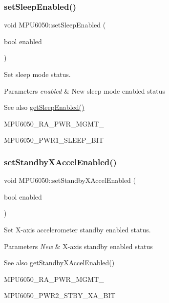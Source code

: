 \subsubsection{\texorpdfstring{setSleepEnabled()}{setSleepEnabled()}}
{\footnotesize\ttfamily void M\+P\+U6050\+::set\+Sleep\+Enabled (\begin{DoxyParamCaption}\item[{bool}]{enabled }\end{DoxyParamCaption})}

Set sleep mode status. 
\begin{DoxyParams}{Parameters}
{\em enabled} & New sleep mode enabled status \\
\hline
\end{DoxyParams}
\begin{DoxySeeAlso}{See also}
\mbox{\hyperlink{class_m_p_u6050_a196404ef04b959083d4bf5e6f1cd8b98}{get\+Sleep\+Enabled()}} 

M\+P\+U6050\+\_\+\+R\+A\+\_\+\+P\+W\+R\+\_\+\+M\+G\+M\+T\+\_ 

M\+P\+U6050\+\_\+\+P\+W\+R1\+\_\+\+S\+L\+E\+E\+P\+\_\+\+B\+IT 
\end{DoxySeeAlso}
\mbox{\label{class_m_p_u6050_af4df87fd2e87f41d06706cfd5bbc2a2c}} 
\subsubsection{\texorpdfstring{setStandbyXAccelEnabled()}{setStandbyXAccelEnabled()}}
{\footnotesize\ttfamily void M\+P\+U6050\+::set\+Standby\+X\+Accel\+Enabled (\begin{DoxyParamCaption}\item[{bool}]{enabled }\end{DoxyParamCaption})}

Set X-\/axis accelerometer standby enabled status. 
\begin{DoxyParams}{Parameters}
{\em New} & X-\/axis standby enabled status \\
\hline
\end{DoxyParams}
\begin{DoxySeeAlso}{See also}
\mbox{\hyperlink{class_m_p_u6050_a99261a04739fdb7a9a1c5b67ce3e710e}{get\+Standby\+X\+Accel\+Enabled()}} 

M\+P\+U6050\+\_\+\+R\+A\+\_\+\+P\+W\+R\+\_\+\+M\+G\+M\+T\+\_ 

M\+P\+U6050\+\_\+\+P\+W\+R2\+\_\+\+S\+T\+B\+Y\+\_\+\+X\+A\+\_\+\+B\+IT 
\end{DoxySeeAlso}
\mbox{\label{class_m_p_u6050_ac1c6d8f623a9ca00a4ddc50f6615b977}} 
